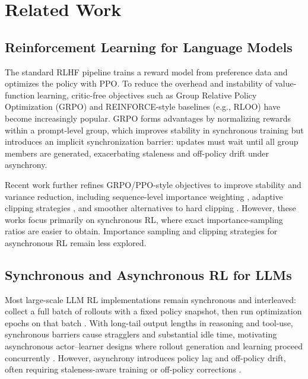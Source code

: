 \section{Related Work}

\subsection{Reinforcement Learning for Language Models}
The standard RLHF pipeline trains a reward model from preference data and optimizes the policy with PPO\citep{ouyang2022training, schulman2017proximal}. To reduce the overhead and instability of value-function learning, critic-free objectives such as Group Relative Policy Optimization (GRPO) \citep{deepseek2024math, deepseek2024r1} and REINFORCE-style baselines (e.g., RLOO) \citep{ahmadian2024back} have become increasingly popular. GRPO forms advantages by normalizing rewards within a prompt-level group, which improves stability in synchronous training but introduces an implicit synchronization barrier: updates must wait until all group members are generated, exacerbating staleness and off-policy drift under asynchrony.

Recent work further refines GRPO/PPO-style objectives to improve stability and variance reduction, including sequence-level importance weighting \citep{zheng2025group}, adaptive clipping strategies \citep{yang2025dcpo}, and smoother alternatives to hard clipping \citep{yue2025vapo}. However, these works focus primarily on synchronous RL, where exact importance-sampling ratios are easier to obtain. Importance sampling and clipping strategies for asynchronous RL remain less explored.


\subsection{Synchronous and Asynchronous RL for LLMs}
Most large-scale LLM RL implementations remain synchronous and interleaved: collect a full batch of rollouts with a fixed policy snapshot, then run optimization epochs on that batch \citep{ouyang2022training}. With long-tail output lengths in reasoning and tool-use, synchronous barriers cause stragglers and substantial idle time, motivating asynchronous actor--learner designs where rollout generation and learning proceed concurrently \citep{mnih2016asynchronous, sutton2018reinforcement}. However, asynchrony introduces policy lag and off-policy drift, often requiring staleness-aware training or off-policy corrections \citep{espeholt2018impala}.

